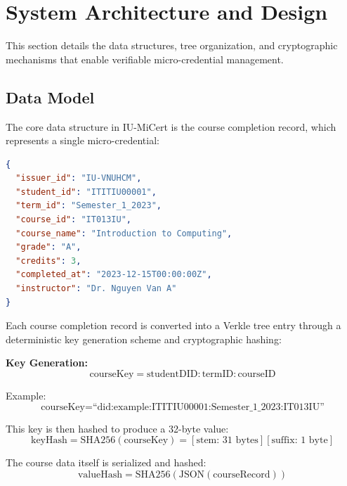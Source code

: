 \section{System Architecture and Design}
\label{sec:system-design}

This section details the data structures, tree organization, and cryptographic mechanisms that enable verifiable micro-credential management.

\subsection{Data Model}
\label{subsec:data-model}

The core data structure in IU-MiCert is the course completion record, which represents a single micro-credential:

\begin{lstlisting}[language=json, caption=Course Completion Record Structure, label=lst:course-record]
{
  "issuer_id": "IU-VNUHCM",
  "student_id": "ITITIU00001",
  "term_id": "Semester_1_2023",
  "course_id": "IT013IU",
  "course_name": "Introduction to Computing",
  "grade": "A",
  "credits": 3,
  "completed_at": "2023-12-15T00:00:00Z",
  "instructor": "Dr. Nguyen Van A"
}
\end{lstlisting}

Each course completion record is converted into a Verkle tree entry through a deterministic key generation scheme and cryptographic hashing:

\textbf{Key Generation:}
\begin{equation}
\text{courseKey} = \text{studentDID}:\text{termID}:\text{courseID}
\end{equation}

Example:
\begin{equation}
\text{courseKey} = \text{``did:example:ITITIU00001:Semester\_1\_2023:IT013IU''}
\end{equation}

This key is then hashed to produce a 32-byte value:
\begin{equation}
\text{keyHash} = \text{SHA256}(\text{courseKey}) = [\text{stem: 31 bytes}][\text{suffix: 1 byte}]
\end{equation}

The course data itself is serialized and hashed:
\begin{equation}
\text{valueHash} = \text{SHA256}(\text{JSON}(\text{courseRecord}))
\end{equation}

